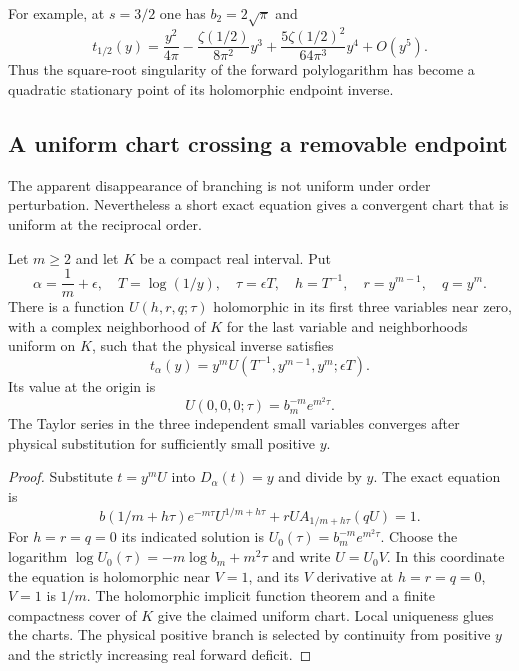 For example, at $s=3/2$ one has $b_2=2\sqrt\pi$ and
\[
 t_{1/2}(y)=\frac{y^2}{4\pi}
 -\frac{\zeta(1/2)}{8\pi^2}y^3
 +\frac{5\zeta(1/2)^2}{64\pi^3}y^4+O(y^5).
\]
Thus the square-root singularity of the forward polylogarithm has
become a quadratic stationary point of its holomorphic endpoint inverse.

\subsection{A uniform chart crossing a removable endpoint}

The apparent disappearance of branching is not uniform under order
perturbation.  Nevertheless a short exact equation gives a convergent
chart that is uniform at the reciprocal order.

\begin{samepage}
\begin{theorem}\label{thm:reciprocal-chart}
Let $m\ge2$ and let $K$ be a compact real interval.  Put
\[
 \alpha=\frac1m+\epsilon,\quad T=\log(1/y),\quad
 \tau=\epsilon T,\quad h=T^{-1},\quad r=y^{m-1},\quad q=y^m.
\]
There is a function $U(h,r,q;\tau)$ holomorphic in its first three
variables near zero, with a complex neighborhood of $K$ for the last
variable and neighborhoods uniform on $K$, such that the physical
inverse satisfies
\[
 t_\alpha(y)=y^m U(T^{-1},y^{m-1},y^m;\epsilon T).
\]
Its value at the origin is
\[
 U(0,0,0;\tau)=b_m^{-m}e^{m^2\tau}.
\]
The Taylor series in the three independent small variables converges
after physical substitution for sufficiently small positive $y$.
\end{theorem}
\end{samepage}

\begin{proof}
Substitute $t=y^m U$ into $D_\alpha(t)=y$ and divide by $y$.
The exact equation is
\[
 b(1/m+h\tau)e^{-m\tau}U^{1/m+h\tau}
 +rU A_{1/m+h\tau}(qU)=1.
\]
For $h=r=q=0$ its indicated solution is
$U_0(\tau)=b_m^{-m}e^{m^2\tau}$.
Choose the logarithm
$\log U_0(\tau)=-m\log b_m+m^2\tau$ and write $U=U_0V$.
In this coordinate the equation is holomorphic near $V=1$, and its
$V$ derivative at $h=r=q=0$, $V=1$ is $1/m$.
The holomorphic implicit function theorem and a finite compactness
cover of $K$ give the claimed uniform chart.  Local uniqueness glues
the charts.  The physical positive branch is selected by continuity
from positive $y$ and the strictly increasing real forward deficit.
\end{proof}

